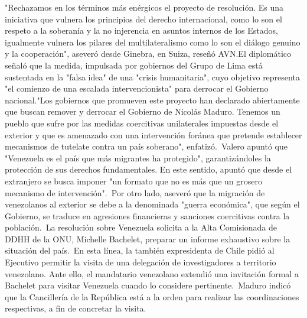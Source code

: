 \documentclass{article}%
\begin{document}
"Rechazamos en los términos más enérgicos el proyecto de resolución. Es una iniciativa que vulnera los principios del derecho internacional, como lo son el respeto a la soberanía y la no injerencia en asuntos internos de los Estados, igualmente vulnera los pilares del multilateralismo como lo son el diálogo genuino y la cooperación", aseveró desde Ginebra, en Suiza, reseñó AVN.El diplomático señaló que la medida, impulsada por gobiernos del Grupo de Lima está sustentada en la "falsa idea" de una "crisis humanitaria", cuyo objetivo representa "el comienzo de una escalada intervencionista" para derrocar el Gobierno nacional."Los gobiernos que promueven este proyecto han declarado abiertamente que buscan remover y derrocar el Gobierno de Nicolás Maduro. Tenemos un pueblo que sufre por las medidas coercitivas unilaterales impuestas desde el exterior y que es amenazado con una intervención foránea que pretende establecer mecanismos de tutelate contra un país soberano", enfatizó.~Valero apuntó que "Venezuela es el país que más migrantes ha protegido", garantizándoles la protección de sus derechos fundamentales. En este sentido, apuntó que desde el extranjero se busca imponer "un formato que no es más que un grosero mecanismo de intervención".~Por otro lado, aseveró que la migración de venezolanos al exterior se debe a la denominada "guerra económica", que según el Gobierno, se traduce en agresiones financieras y sanciones coercitivas contra la población.~La resolución sobre Venezuela solicita a la Alta Comisionada de DDHH de la ONU, Michelle Bachelet, preparar un informe exhaustivo sobre la situación del país.~En esta línea, la también expresidenta de Chile pidió al Ejecutivo permitir la visita de una delegación de investigadores a territorio venezolano.\newline%
\newline%
Ante ello, el mandatario venezolano extendió una invitación formal a Bachelet para visitar Venezuela cuando lo considere pertinente.~Maduro indicó que la Cancillería de la República está a la orden para realizar las coordinaciones respectivas, a fin de concretar la visita.%
\newline%
%
\end{document}
